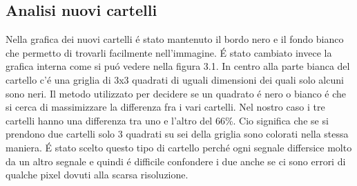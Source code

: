 	\subsection{Analisi nuovi cartelli}
		Nella grafica dei nuovi cartelli \'e stato mantenuto il bordo nero e il fondo bianco che permetto di trovarli facilmente nell'immagine. \'E stato cambiato invece la grafica interna come si pu\'o vedere nella figura 3.1. In centro alla parte bianca del cartello c'\'e una griglia di 3x3  quadrati di uguali dimensioni dei quali solo alcuni sono neri. Il metodo utilizzato per decidere se un quadrato \'e nero o bianco \'e che si cerca di massimizzare la differenza fra i vari cartelli. Nel nostro caso i tre cartelli hanno una differenza tra uno e l'altro del 66\%. Cio significa che se si prendono due cartelli solo 3 quadrati su sei della griglia sono colorati nella stessa maniera.
		\newline \'E stato scelto questo tipo di cartello perch\'e ogni segnale differsice molto da un altro segnale e quindi \'e difficile confondere i due anche se ci sono errori di qualche pixel dovuti alla scarsa risoluzione.

